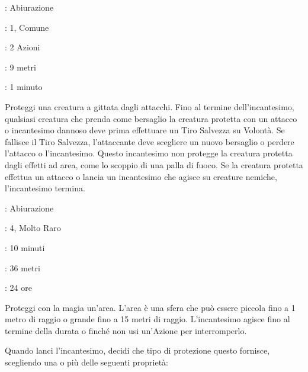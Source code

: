 \begin{multicols}{2}
\noindent\colorbox{OBSSgold!10}{
\begin{minipage}{0.95\linewidth}
\begin{description}[noitemsep, topsep=0pt, parsep=0pt, partopsep=0pt, leftmargin=0cm, labelwidth=1.3cm]
	\item[\textbf{Lista}]: Abiurazione
	\item[\textbf{Livello}]: 1, Comune
	\item[\textbf{Lancio}]: 2 Azioni
	\item[\textbf{Gittata}]: 9 metri
	\item[\textbf{Durata}]: 1 minuto
\end{description}
\end{minipage}}\smallskip

Proteggi una creatura a gittata dagli attacchi. Fino al termine dell'incantesimo, qualsiasi creatura che prenda come bersaglio la creatura protetta con un attacco o incantesimo dannoso deve prima effettuare un Tiro Salvezza su Volontà. Se fallisce il Tiro Salvezza, l'attaccante deve scegliere un nuovo bersaglio o perdere l'attacco o l'incantesimo. Questo incantesimo non protegge la creatura protetta dagli effetti ad area, come lo scoppio di una palla di fuoco. Se la creatura protetta effettua un attacco o lancia un incantesimo che agisce su creature nemiche, l'incantesimo termina.

\noindent\colorbox{OBSSgold!10}{
\begin{minipage}{0.95\linewidth}
\begin{description}[noitemsep, topsep=0pt, parsep=0pt, partopsep=0pt, leftmargin=0cm, labelwidth=1.3cm]
	\item[\textbf{Lista}]: Abiurazione
	\item[\textbf{Livello}]: 4, Molto Raro
	\item[\textbf{Lancio}]: 10 minuti
	\item[\textbf{Gittata}]: 36 metri
	\item[\textbf{Durata}]: 24 ore
\end{description}
\end{minipage}}\smallskip

Proteggi con la magia un'area. L'area è una sfera che può essere piccola fino a 1 metro di raggio o grande fino a 15 metri di raggio. L'incantesimo agisce fino al termine della durata o finché non usi un'Azione per interromperlo.

Quando lanci l'incantesimo, decidi che tipo di protezione questo fornisce, scegliendo una o più delle seguenti proprietà:


\end{multicols}
